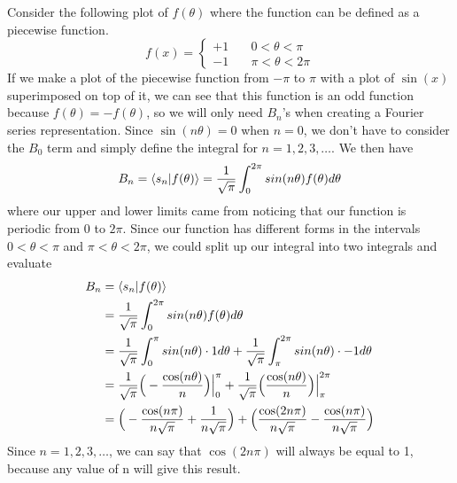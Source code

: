 \documentclass{article}
\newcommand{\be}{\begin{equation}}
\newcommand{\ee}{\end{equation}}
\begin{document}
Consider the following plot of $f(\theta)$
where the function can be defined as a piecewise function.
\be
  f(x) =
  \left\{
    \begin{array}{ll}
      +1 & \quad 0 < \theta < \pi \\
      -1 & \quad \pi < \theta < 2 \pi
    \end{array}
  \right.
\ee
If we make a plot of the piecewise function from $- \pi$ to $\pi$ with a plot of $\sin(x)$ superimposed on top of it,
we can see that this function is an odd function because $f(\theta) = - f(\theta)$, so we will only need $B_n$'s when creating a Fourier series representation.
Since $\sin(n \theta) = 0$ when $n = 0$, we don't have to consider the $B_0$ term and simply define the integral for $n = 1, 2, 3, \hdots$.
We then have
\be
  B_n = \braket{s_n|f(\theta)} = \frac{1}{\sqrt{\pi}} \int_0^{2 \pi} sin(n \theta) f(\theta) d\theta
\ee
where our upper and lower limits came from noticing that our function is periodic from 0 to $2 \pi$.
Since our function has different forms in the intervals $0 < \theta < \pi$ and $\pi < \theta < 2 \pi$, we could split up our integral into two integrals and evaluate
\be
  \begin{split}
    B_n &= \braket{s_n|f(\theta)} \\
    &= \frac{1}{\sqrt{\pi}} \int_0^{2 \pi} sin(n \theta) f(\theta) d\theta \\
    &= \frac{1}{\sqrt{\pi}} \int_0^{\pi} sin(n \theta) \cdot 1 d\theta + \frac{1}{\sqrt{\pi}} \int_{\pi}^{2 \pi} sin(n \theta) \cdot -1 d\theta \\
    &= \frac{1}{\sqrt{\pi}} \Big( - \frac{\cos(n \theta)}{n} \Big) \Big|_0^{\pi} + \frac{1}{\sqrt{\pi}} \Big( \frac{\cos(n \theta)}{n} \Big) \Big|_{\pi}^{2 \pi} \\
    &= \Big( - \frac{\cos(n \pi)}{n \sqrt{\pi}} + \frac{1}{n \sqrt{\pi}} \Big) + \Big( \frac{\cos(2 n \pi)}{n \sqrt{\pi}} - \frac{\cos(n \pi)}{n \sqrt{\pi}} \Big)
  \end{split}
\ee
Since $n = 1, 2, 3, \hdots$, we can say that $\cos(2 n \pi)$ will always be equal to 1, because any value of n will give this result.
\end{document}
